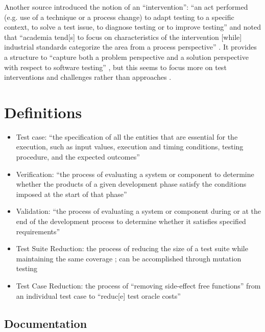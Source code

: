 Another source
introduced the notion of an ``intervention'': ``an act performed (e.g. use of a
technique or a process change) to adapt testing
to a specific context, to solve
a test issue, to diagnose testing or to improve testing''
\citep[p.~1]{EngströmAndPetersen2015} and noted that ``academia tend[s] to focus on
characteristics of the intervention [while] industrial standards categorize the
area from a process perspective'' \citep[p.~2]{EngströmAndPetersen2015}.
It provides a structure to ``capture both a problem perspective and a solution
perspective with respect to software testing'' \citep[pp.~3-4]{EngströmAndPetersen2015},
but this seems to focus more on test interventions and challenges rather than
approaches \citep[Fig.~5]{EngströmAndPetersen2015}.

\section{Definitions}

\begin{itemize}
    \item Test case: ``the specification of all the entities
          that are essential for the execution, such as input values,
          execution and timing conditions, testing procedure, and the
          expected outcomes'' \citep[pp.~5-1 to 5-2]{SWEBOK2024}
    \item Verification: ``the process of evaluating a system or component
          to determine whether the products of a given development phase
          satisfy the conditions imposed at the start of that phase''
          \citep[p.~400]{vanVliet2000}
    \item Validation: ``the process of evaluating a system or component
          during or at the end of the development process to determine
          whether it satisfies specified requirements''
          \citep[p.~400]{vanVliet2000}
    \item Test Suite Reduction: the process of reducing the size of a test
          suite while maintaining the same coverage
          \citep[p.~519]{BarrEtAl2015}; can be accomplished through
          mutation testing
    \item Test Case Reduction: the process of ``removing side-effect free
          functions'' from an individual test case to ``reduc[e] test oracle
          costs'' \citep[p.~519]{BarrEtAl2015}
\end{itemize}

\subsection{Documentation}

